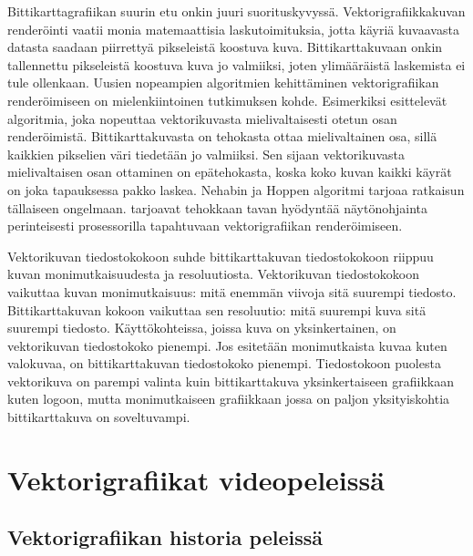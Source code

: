 \documentclass[utf8,bachelor]{gradu3}
\begin{document}
Bittikarttagrafiikan suurin etu onkin juuri suorituskyvyssä. Vektorigrafiikkakuvan renderöinti vaatii monia matemaattisia laskutoimituksia, jotta käyriä kuvaavasta datasta saadaan piirrettyä pikseleistä koostuva kuva. Bittikarttakuvaan onkin tallennettu pikseleistä koostuva kuva jo valmiiksi, joten ylimääräistä laskemista ei tule ollenkaan. \parencite{RefWorks:doc:5bdc5292e4b05afcfde5b171} Uusien nopeampien algoritmien kehittäminen vektorigrafiikan renderöimiseen on mielenkiintoinen tutkimuksen kohde. Esimerkiksi \textcite{RefWorks:doc:5bdf538de4b04939ba18218f} esittelevät algoritmia, joka nopeuttaa vektorikuvasta mielivaltaisesti otetun osan renderöimistä. Bittikarttakuvasta on tehokasta ottaa mielivaltainen osa, sillä kaikkien pikselien väri tiedetään jo valmiiksi. Sen sijaan vektorikuvasta mielivaltaisen osan ottaminen on epätehokasta, koska koko kuvan kaikki käyrät on joka tapauksessa pakko laskea. Nehabin ja Hoppen algoritmi tarjoaa ratkaisun tällaiseen ongelmaan. \parencite{RefWorks:doc:5bdf538de4b04939ba18218f} \textcite{RefWorks:doc:5bc4a5cce4b080e02f7eff1b} tarjoavat tehokkaan tavan hyödyntää näytönohjainta perinteisesti prosessorilla tapahtuvaan vektorigrafiikan renderöimiseen.

Vektorikuvan tiedostokokoon suhde bittikarttakuvan tiedostokokoon riippuu kuvan monimutkaisuudesta ja resoluutiosta. Vektorikuvan tiedostokokoon vaikuttaa kuvan monimutkaisuus: mitä enemmän viivoja sitä suurempi tiedosto. Bittikarttakuvan kokoon vaikuttaa sen resoluutio: mitä suurempi kuva sitä suurempi tiedosto. Käyttökohteissa, joissa kuva on yksinkertainen, on vektorikuvan tiedostokoko pienempi. Jos esitetään monimutkaista kuvaa kuten valokuvaa, on bittikarttakuvan tiedostokoko pienempi. Tiedostokoon puolesta vektorikuva on parempi valinta kuin bittikarttakuva yksinkertaiseen grafiikkaan kuten logoon, mutta monimutkaiseen grafiikkaan jossa on paljon yksityiskohtia bittikarttakuva on soveltuvampi. \parencite{RefWorks:doc:5bdf4af9e4b0f02deeb8a48a}

\chapter{Vektorigrafiikat videopeleissä}

\section{Vektorigrafiikan historia peleissä}

\end{document}
